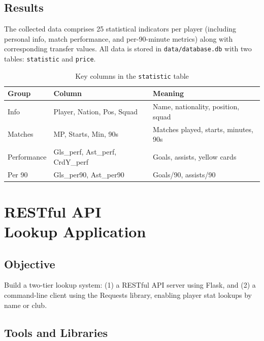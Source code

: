 \documentclass[a4paper,12pt]{report}
\begin{document}
\section{Results}

The collected data comprises 25 statistical indicators per player (including personal info, match performance, and per-90-minute metrics) along with corresponding transfer values. All data is stored in \texttt{data/database.db} with two tables: \texttt{statistic} and \texttt{price}.

\begin{table}[H]
\centering
\caption{Key columns in the \texttt{statistic} table}
\label{tab:stat_cols}
\begin{tabularx}{\textwidth}{l l X}
\toprule
\textbf{Group} & \textbf{Column} & \textbf{Meaning} \\
\midrule
Info         & Player, Nation, Pos, Squad & Name, nationality, position, squad \\
Matches      & MP, Starts, Min, 90s       & Matches played, starts, minutes, 90s \\
Performance  & Gls\_perf, Ast\_perf, CrdY\_perf & Goals, assists, yellow cards \\
Per 90       & Gls\_per90, Ast\_per90      & Goals/90, assists/90 \\
\bottomrule
\end{tabularx}
\end{table}


\chapter{\texorpdfstring{RESTful API\\ Lookup Application}{RESTful API Lookup Application}}

\section{Objective}

Build a two-tier lookup system: (1) a RESTful API server using Flask, and (2) a command-line client using the Requests library, enabling player stat lookups by name or club.

\section{Tools and Libraries}
\end{document}
